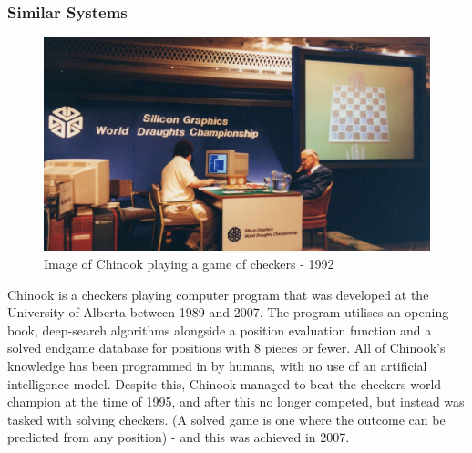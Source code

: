 \documentclass{article}
\begin{document}
    \subsubsection{Similar Systems}
    \begin{figure}
        \centering
        \includegraphics[scale=0.145]{1992Tinsleymatch.jpg}
        \caption{Image of Chinook playing a game of checkers - 1992}
    \end{figure}
    Chinook is a checkers playing computer program that was developed at the University of Alberta between
    1989 and 2007. The program utilises an opening book, deep-search algorithms alongside a position evaluation function
    and a solved endgame database for positions with 8 pieces or fewer.
    All of Chinook's knowledge has been programmed in by humans, with no use of an artificial intelligence model. Despite this,
    Chinook managed to beat the checkers world champion at the time of 1995, and after this no longer competed, but instead was
    tasked with solving checkers. (A solved game is one where the outcome can be predicted from any position) - and this was achieved in 2007.
\end{document}
